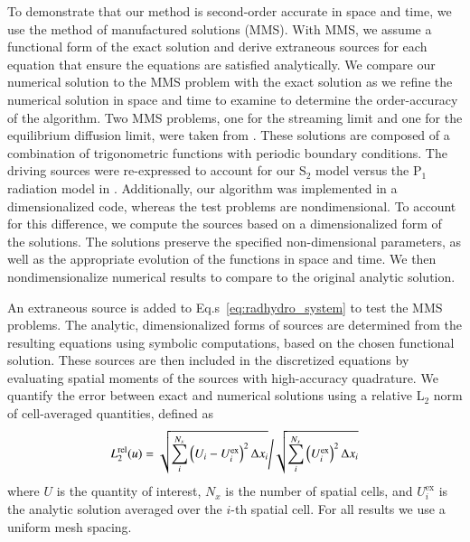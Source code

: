 \documentclass[preprint,12pt]{elsarticle}
\begin{document}
To demonstrate that our method is second-order accurate in space and time, we use the method of manufactured solutions (MMS).    
With MMS, we assume a functional form of the exact solution and  derive extraneous sources for each equation that ensure the
equations are satisfied analytically.  We compare our numerical solution to the MMS
problem with the exact solution as we refine the numerical
solution in space and time to examine to determine the order-accuracy of the algorithm.  
Two MMS problems, one for the streaming limit and one for the equilibrium diffusion limit, were taken from \cite{mcclarren2}.  These
solutions are composed of a combination of trigonometric functions with periodic boundary
conditions.  The driving sources were re-expressed 
to account for our  S$_2$ model versus the P$_1$ radiation model in \cite{mcclarren2}. Additionally, our algorithm was implemented in a
dimensionalized code, whereas the test problems are nondimensional. To account for this
difference, we compute the sources based on a dimensionalized form of the solutions.  The
solutions preserve the specified non-dimensional parameters, as well as the appropriate
evolution of the functions in space and time.  We then
nondimensionalize numerical results to compare to the original analytic solution.

An extraneous source is added
to Eq.s~\eqref{eq:radhydro_system} to test the MMS problems. The analytic,
dimensionalized forms of  sources are determined from the resulting equations using symbolic computations, based on the chosen functional solution.
These sources are then included in the discretized equations by evaluating spatial moments of the sources with high-accuracy quadrature. 
We quantify the error between exact and numerical solutions using a relative L$_2$ norm of cell-averaged quantities, defined as
\begin{equation}
    \left.  L^{\mathrm{rel}}_2(u) = \sqrt{\sum\limits_i^{N_x} \left(U_i - U_i^{\text{ex}} \right)^2 \Delta x_i} \middle / 
    \sqrt{\sum\limits_i^{N_x} \left(U_i^{\text{ex}}\right)^2 \Delta x_i}  \right.
\end{equation}
where $U$ is the quantity of interest, $N_x$ is the number of spatial cells, and $U_i^{\text{ex}}$ is the analytic solution
averaged over the $i$-th spatial cell.  For all results we use a uniform mesh spacing.
\end{document}
